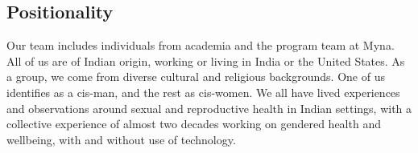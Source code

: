 \subsection{Positionality}
Our team includes individuals from academia and the program team at Myna. All of us are of Indian origin, working or living in India or the United States. As a group, we come from diverse cultural and religious backgrounds. One of us identifies as a cis-man, and the rest as cis-women. We all have lived experiences and observations around sexual and reproductive health in Indian settings, with a collective experience of almost two decades working on gendered health and wellbeing, with and without use of technology. 

